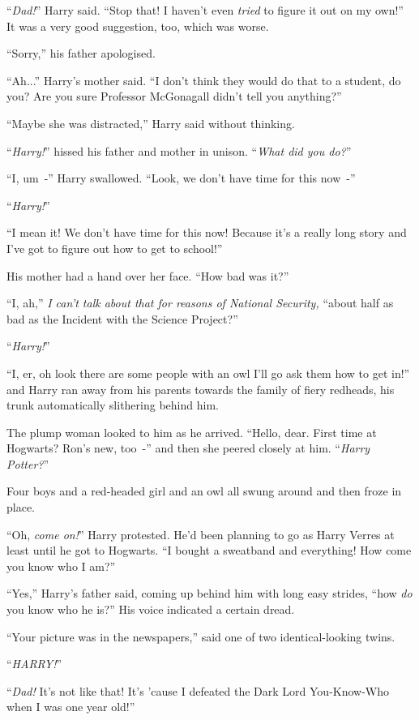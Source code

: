 ``\emph{Dad!}'' Harry said. ``Stop that! I haven't even \emph{tried} to figure it out on my own!'' It was a very good suggestion, too, which was worse.

``Sorry,'' his father apologised.

``Ah...'' Harry's mother said. ``I don't think they would do that to a student, do you? Are you sure Professor McGonagall didn't tell you anything?''

``Maybe she was distracted,'' Harry said without thinking.

``\emph{Harry!}'' hissed his father and mother in unison. ``\emph{What did you do?}''

``I, um~-'' Harry swallowed. ``Look, we don't have time for this now~-''

``\emph{Harry!}''

``I mean it! We don't have time for this now! Because it's a really long story and I've got to figure out how to get to school!''

His mother had a hand over her face. ``How bad was it?''

``I, ah,'' \emph{I can't talk about that for reasons of National Security,} ``about half as bad as the Incident with the Science Project?''

``\emph{Harry!}''

``I, er, oh look there are some people with an owl I'll go ask them how to get in!'' and Harry ran away from his parents towards the family of fiery redheads, his trunk automatically slithering behind him.

The plump woman looked to him as he arrived. ``Hello, dear. First time at Hogwarts? Ron's new, too~-'' and then she peered closely at him. ``\emph{Harry Potter?}''

Four boys and a red-headed girl and an owl all swung around and then froze in place.

``Oh, \emph{come on!}'' Harry protested. He'd been planning to go as Harry Verres at least until he got to Hogwarts. ``I bought a sweatband and everything! How come you know who I am?''

``Yes,'' Harry's father said, coming up behind him with long easy strides, ``how \emph{do} you know who he is?'' His voice indicated a certain dread.

``Your picture was in the newspapers,'' said one of two identical-looking twins.

``\emph{HARRY!}''

``\emph{Dad!} It's not like that! It's 'cause I defeated the Dark Lord You-Know-Who when I was one year old!''

